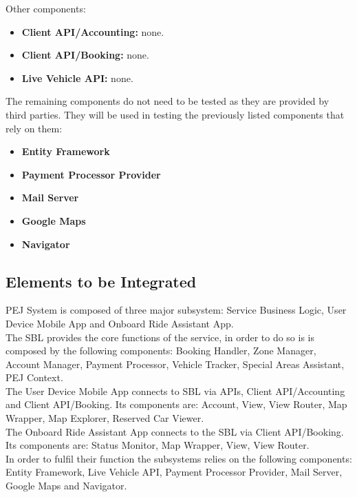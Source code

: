Other components:
\begin{itemize}
    \item \textbf{Client API/Accounting:} none.
    \item \textbf{Client API/Booking:} none.
    \item \textbf{Live Vehicle API:} none.
\end{itemize}
The remaining components do not need to be tested as they are provided by third parties. They will be used in testing the previously listed components that rely on them:
\begin{itemize}
    \item \textbf{Entity Framework}
    \item \textbf{Payment Processor Provider}
    \item \textbf{Mail Server}
    \item \textbf{Google Maps}
    \item \textbf{Navigator}
\end{itemize}

\subsection{Elements to be Integrated}
PEJ System is composed of three major subsystem: Service Business Logic, User Device Mobile App and Onboard Ride Assistant App.\\
The SBL provides the core functions of the service, in order to do so is is composed by the following components: Booking Handler, Zone Manager, Account Manager, Payment Processor, Vehicle Tracker, Special Areas Assistant, PEJ Context.\\
The User Device Mobile App connects to SBL via APIs, Client API/Accounting and Client API/Booking. Its components are: Account, View, View Router, Map Wrapper, Map Explorer, Reserved Car Viewer.\\
The Onboard Ride Assistant App connects to the SBL via Client API/Booking. Its components are: Status Monitor, Map Wrapper, View, View Router.\\
In order to fulfil their function the subsystems relies on the following components: Entity Framework, Live Vehicle API, Payment Processor Provider, Mail Server, Google Maps and Navigator.


